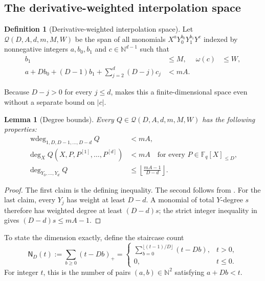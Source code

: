 \documentclass[11pt,letterpaper]{article}
\newtheorem{lemma}[lemma]{Lemma}
\theoremstyle{definition}
\newtheorem{definition}[definition]{Definition}
\newcommand{\F}{\mathbb{F}}
\newcommand{\N}{\mathbb{N}}
\newcommand{\wtdeg}{\operatorname{wdeg}}
\newcommand{\Qspace}{\mathcal{Q}}
\newcommand{\positive}[1]{\left(#1\right)_{+}}
\begin{document}
\subsection{The derivative-weighted interpolation space}

\begin{definition}[Derivative-weighted interpolation space]
\label{def:cap-free-interpolation-space}
Let \(\Qspace(D,A,d,m,M,W)\) be the span of all monomials
\(X^aY_0^{b_0}Y_1^{b_1}Y^c\) indexed by nonnegative integers
\(a,b_0,b_1\) and \(c\in\N^{d-1}\) such that
\begin{align}
  b_1&\leq M,
  &\omega(c)&\leq W,
  \label{eq:cap-free-support}\\
  a+Db_0+(D-1)b_1+
  \sum_{j=2}^{d}(D-j)c_j&<mA.
  &&
  \label{eq:cap-free-weighted-degree}
\end{align}
\end{definition}
Because \(D-j>0\) for every \(j\leq d\),
 makes this a finite-dimensional space even
without a separate bound on \(|c|\).

\begin{lemma}[Degree bounds]
\label{lem:cap-free-degree-bounds}
Every \(Q\in\Qspace(D,A,d,m,M,W)\) has the following properties:
\begin{align}
  \wtdeg_{1,D,D-1,\ldots,D-d}Q&<mA,
  \label{eq:cap-free-weighted-bound}\\
  \deg_X Q(X,P,P^{[1]},\ldots,P^{[d]})&<mA
  \quad\text{for every }P\in\F_q[X]_{\leq D},
  \label{eq:cap-free-specialization-bound}\\
  \deg_{Y_0,\ldots,Y_d}Q
  &\leq
  \left\lfloor\frac{mA-1}{D-d}\right\rfloor.
  \label{eq:cap-free-total-y-degree}
\end{align}
\end{lemma}

\begin{proof}
The first claim is the defining inequality.  The second follows from
.  For the last claim, every
\(Y_j\) has weight at least \(D-d\).  A monomial of total \(Y\)-degree
\(s\) therefore has weighted degree at least \((D-d)s\); the strict integer
inequality in  gives
\((D-d)s\leq mA-1\).
\end{proof}

To state the dimension exactly, define the staircase count
\begin{equation}
  \mathsf N_D(t)
  :=
  \sum_{b\geq 0}\positive{t-Db}
  =
  \begin{cases}
    \displaystyle
    \sum_{b=0}^{\lfloor(t-1)/D\rfloor}(t-Db),&t>0,\\[1.2ex]
    0,&t\leq 0.
  \end{cases}
  \label{eq:staircase-count}
\end{equation}
For integer \(t\), this is the number of pairs
\((a,b)\in\N^2\) satisfying \(a+Db<t\).
\end{document}
